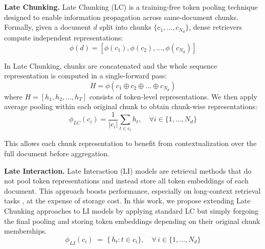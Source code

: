 




\noindent\textbf{Late Chunking.}
Late Chunking  (LC) is a training-free token pooling technique designed to enable information propagation across same-document chunks. Formally, given a document $d$ split into chunks $\{c_1, \dots, c_{N_d}\}$, dense retrievers compute independent representations:  
\begin{equation*}
\phi(d) = [\phi(c_1), \phi(c_2), \dots, \phi(c_{N_d})]
\end{equation*}

In Late Chunking, chunks are concatenated and the whole sequence representation is computed in a single-forward pass:  
\begin{equation*}
H = \phi(c_1 \oplus c_2 \oplus \dots \oplus c_{N_d})
\end{equation*}
where $H = [h_1, h_2, \dots, h_T]$ consists of token-level representations.  We then apply average pooling within each original chunk to obtain chunk-wise representations:  
\begin{equation*}
\phi_{LC}(c_i) = \frac{1}{|c_i|} \sum_{t \in c_i} h_t, \quad \forall i \in \{1, \dots, N_d\}
\end{equation*}

This allows each chunk representation to benefit from contextualization over the full document before aggregation.



\noindent\textbf{Late Interaction.} 
Late Interaction (LI) models  are retrieval methods that do not pool token representations and instead store all token embeddings of each document. This approach boosts performance, especially on long-context retrieval tasks , at the expense of storage cost. In this work, we propose extending Late Chunking approaches to LI models by applying standard LC but simply forgoing the final pooling and storing token embeddings depending on their original chunk memberships.
\begin{equation*}
\phi_{LI}(c_i) \;=\; \{\,h_t : t \in c_i\}, 
\quad \forall\,i \in \{1, \dots, N_d\}
\end{equation*}

